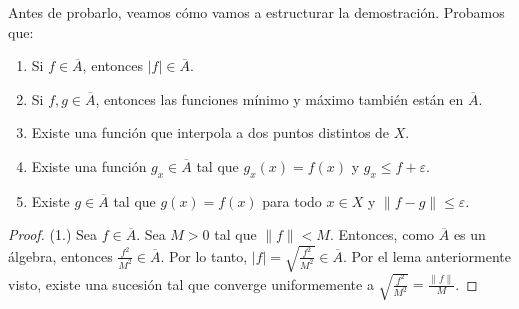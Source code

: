 Antes de probarlo, veamos cómo vamos a estructurar la demostración. Probamos que:
\begin{enumerate}
	\item Si $f \in \overline{A}$, entonces $|f| \in \overline{A}$.
	\item Si $f, g \in \overline{A}$, entonces las funciones mínimo y máximo también están en $\overline{A}$.
	\item Existe una función que interpola a dos puntos distintos de $X$.
	\item Existe una función $g_x \in \overline{A}$ tal que $g_x(x) = f(x)$ y $g_x \leq f + \varepsilon$.
	\item Existe $g \in \overline{A}$ tal que $g(x) = f(x)$ para todo $x \in X$ y $\| f - g \| \leq \varepsilon$.
\end{enumerate}

\begin{proof}
	(1.) Sea $f \in \overline{A}$. Sea $M > 0$ tal que $\|f\| < M$. Entonces, como $\overline{A}$ es un álgebra, entonces $\frac{f^2}{M^2} \in \overline{A}$. Por lo tanto, $|f| = \sqrt{\frac{f^2}{M^2}} \in \overline{A}$. Por el lema anteriormente visto, existe una sucesión tal que converge uniformemente a $\sqrt{\frac{f^2}{M^2}} = \frac{\|f\|}{M}$.
\end{proof}